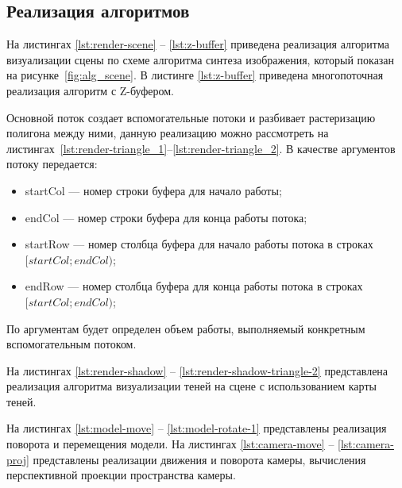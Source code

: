 \subsection{Реализация алгоритмов}

На листингах \ref{lst:render-scene} -- \ref{lst:z-buffer} приведена реализация алгоритма визуализации сцены по схеме алгоритма синтеза изображения, который показан на рисунке~\ref{fig:alg_scene}.
В листинге \ref{lst:z-buffer} приведена многопоточная реализация алгоритм с Z-буфером.

Основной поток создает вспомогательные потоки и разбивает растеризацию полигона между ними, данную реализацию можно рассмотреть на листингах~\ref{lst:render-triangle_1}--\ref{lst:render-triangle_2}.
В качестве аргументов потоку передается:
\begin{itemize}
	\item startCol --- номер строки буфера для начало работы;
	\item endCol --- номер строки буфера для конца работы потока;
	\item startRow --- номер столбца буфера для начало работы потока в строках $[startCol;endCol)$;
	\item endRow --- номер столбца буфера для конца работы потока в строках $[startCol;endCol)$;
\end{itemize}
По аргументам будет определен объем работы, выполняемый конкретным вспомогательным потоком.

На листингах \ref{lst:render-shadow} -- \ref{lst:render-shadow-triangle-2} представлена реализация алгоритма визуализации теней на сцене с использованием карты теней.

На листингах \ref{lst:model-move} -- \ref{lst:model-rotate-1} представлены реализация поворота и перемещения модели. На листингах \ref{lst:camera-move} -- \ref{lst:camera-proj} представлены реализации движения и поворота камеры, вычисления перспективной проекции пространства камеры.

\clearpage



\clearpage



\clearpage



